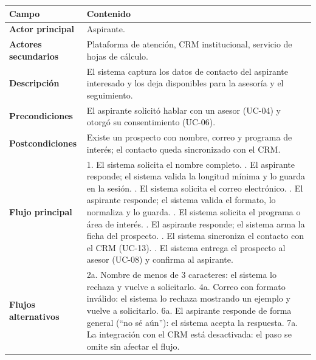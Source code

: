 \documentclass[12pt,a4paper]{report}
\newcommand{\tablacompacta}{\setstretch{1.1}\small}
\newcommand{\cabecera}[1]{\rowcolor{filacabecera}#1}
\begin{document}
\begin{table}[H]
    \centering
    \tablacompacta
    \begin{tabularx}{\textwidth}{p{3.2cm}X}
        \toprule
        \cabecera{\textbf{Campo}} & \textbf{Contenido} \\
        \midrule
        \textbf{Actor principal} & Aspirante. \\
        \textbf{Actores secundarios} & Plataforma de atención, CRM institucional, servicio de hojas de cálculo. \\
        \textbf{Descripción} & El sistema captura los datos de contacto del aspirante interesado y los deja disponibles para la asesoría y el seguimiento. \\
        \textbf{Precondiciones} & El aspirante solicitó hablar con un asesor (UC-04) y otorgó su consentimiento (UC-06). \\
        \textbf{Postcondiciones} & Existe un prospecto con nombre, correo y programa de interés; el contacto queda sincronizado con el CRM. \\
        \textbf{Flujo principal} &
        1. El sistema solicita el nombre completo. \newline
        2. El aspirante responde; el sistema valida la longitud mínima y lo guarda en la sesión. \newline
        3. El sistema solicita el correo electrónico. \newline
        4. El aspirante responde; el sistema valida el formato, lo normaliza y lo guarda. \newline
        5. El sistema solicita el programa o área de interés. \newline
        6. El aspirante responde; el sistema arma la ficha del prospecto. \newline
        7. El sistema sincroniza el contacto con el CRM (UC-13). \newline
        8. El sistema entrega el prospecto al asesor (UC-08) y confirma al aspirante. \\
        \textbf{Flujos alternativos} &
        2a. Nombre de menos de 3 caracteres: el sistema lo rechaza y vuelve a solicitarlo. \newline
        4a. Correo con formato inválido: el sistema lo rechaza mostrando un ejemplo y vuelve a solicitarlo. \newline
        6a. El aspirante responde de forma general (``no sé aún''): el sistema acepta la respuesta. \newline
        7a. La integración con el CRM está desactivada: el paso se omite sin afectar el flujo. \\

\end{tabularx}
\end{table}
\end{document}
